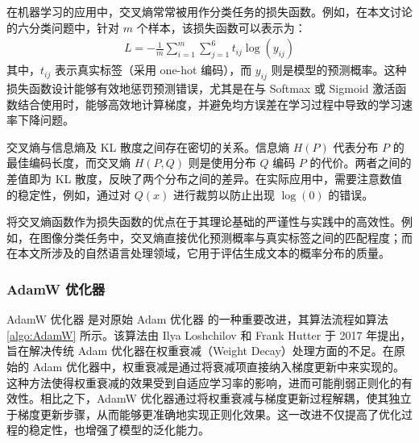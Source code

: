 在机器学习的应用中，交叉熵常常被用作分类任务的损失函数。例如，在本文讨论的六分类问题中，针对 \( m \) 个样本，该损失函数可以表示为：
\begin{align}
    L=-\frac{1}{m}\sum_{i=1}^m \sum_{j=1}^6 t_{ij}\log(y_{ij})
\end{align}
其中，\( t_{ij} \) 表示真实标签（采用 one-hot 编码），而 \( y_{ij} \) 则是模型的预测概率。这种损失函数设计能够有效地惩罚预测错误，尤其是在与 Softmax 或 Sigmoid 激活函数结合使用时，能够高效地计算梯度，并避免均方误差在学习过程中导致的学习速率下降问题。

交叉熵与信息熵及 KL 散度之间存在密切的关系。信息熵 \( H(P) \) 代表分布 \( P \) 的最佳编码长度，而交叉熵 \( H(P, Q) \) 则是使用分布 \( Q \) 编码 \( P \) 的代价。两者之间的差值即为 KL 散度，反映了两个分布之间的差异。在实际应用中，需要注意数值的稳定性，例如，通过对 \( Q(x) \) 进行裁剪以防止出现 \( \log(0) \) 的错误。

将交叉熵函数作为损失函数的优点在于其理论基础的严谨性与实践中的高效性。例如，在图像分类任务中，交叉熵直接优化预测概率与真实标签之间的匹配程度；而在本文所涉及的自然语言处理领域，它用于评估生成文本的概率分布的质量。

\subsubsection{AdamW 优化器}

AdamW 优化器 \cite{AdamW} 是对原始 Adam 优化器 \cite{Adam} 的一种重要改进，其算法流程如算法 \ref{algo:AdamW} 所示。该算法由 Ilya Loshchilov 和 Frank Hutter 于 2017 年提出，旨在解决传统 Adam 优化器在权重衰减（Weight Decay）处理方面的不足。在原始的 Adam 优化器中，权重衰减是通过将衰减项直接纳入梯度更新中来实现的。这种方法使得权重衰减的效果受到自适应学习率的影响，进而可能削弱正则化的有效性。相比之下，AdamW 优化器通过将权重衰减与梯度更新过程解耦，使其独立于梯度更新步骤，从而能够更准确地实现正则化效果。这一改进不仅提高了优化过程的稳定性，也增强了模型的泛化能力。

